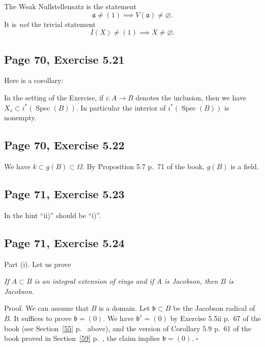 \documentclass[parskip=half,fontsize=12pt]{scrartcl}%
\newcommand{\oo}{\operatorname}\newcommand{\ooo}{\operatorname*}
\newcommand{\mf}{\mathfrak}
\newcommand{\aaa}{\mf a}
\newcommand{\bbb}{\mf b}
\newcommand{\mmm}{\mf m}
\newcommand{\nnn}{\mf n}
\newcommand{\Spec}{\operatorname{Spec}}\newcommand{\Sp}{\operatorname{Spec}}
\begin{document}
The Weak Nullstellensatz is the statement
$$
\aaa\ne(1)\implies V(\aaa)\ne\varnothing.
$$ 
It is \emph{not} the trivial statement 
$$
I(X)\ne(1)\implies X\ne\varnothing.
$$ 

\subsection{Page 70, Exercise 5.21}\label{522}%

Here is a corollary:

In the setting of the Exercise, if $i:A\to B$ denotes the inclusion, then we have $X_s\subset i^*(\Spec(B))$. In particular the interior of $i^*(\Spec(B))$ is nonempty. 

\subsection{Page 70, Exercise 5.22}%

We have $k\subset g(B)\subset\Omega$. By Proposition 5.7 p.~71 of the book, $g(B)$ is a field.

\subsection{Page 71, Exercise 5.23}%

In the hint ``ii)'' should be ``i)''.

\subsection{Page 71, Exercise 5.24}%
 
Part (i). Let us prove %

\emph{If $A\subset B$ is an integral extension of rings and if $A$ is Jacobson, then $B$ is Jacobson.}

Proof. %
We can assume that $B$ is a domain. Let $\bbb\subset B$ be the Jacobson radical of $B$. It suffices to prove $\bbb=(0)$. We have %
$\bbb^{\oo c}=(0)$ by Exercise 5.5ii p.~67 of the book (see Section~\ref{55} p.~\pageref{55} above), and %
the version of Corollary 5.9 p.~61 of the book proved in Section~\ref{59} p.~\pageref{59}, the claim implies $\bbb=(0)$. $\square$
\end{document}
